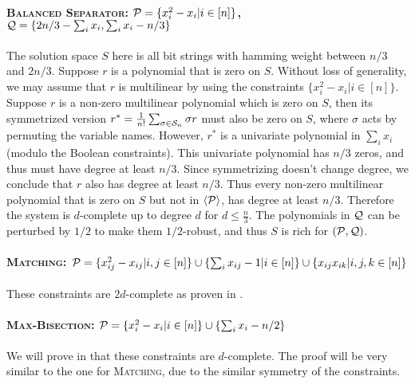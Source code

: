 \paragraph{\textsc{Balanced Separator}: $\mathcal P = \{x_i^2 - x_i | i \in [n]\}$, $\mathcal Q = \{2n/3 - \sum_i x_i, \sum_i x_i - n/3\}$}
%
The solution space $S$ here is all bit strings with hamming weight between $n/3$ and $2n/3$. 
%
Suppose $r$ is a polynomial that is zero on $S$.  
%
Without loss of generality, we may assume that $r$ is multilinear by using the constraints $\{x_i^2 - x_i | i \in [n]\}$.
%
Suppose $r$ is a non-zero multilinear polynomial which is zero on $S$, then its symmetrized version $r^* = \frac{1}{n!}\sum_{\sigma \in \mathcal S_n} \sigma r$ must also be zero on $S$, where $\sigma$ acts by permuting the variable names. However, $r^*$ is a univariate polynomial in $\sum_i x_i$ (modulo the Boolean constraints). 
%
This univariate polynomial has $n/3$ zeros, and thus must have degree at least $n/3$. Since symmetrizing doesn't change degree, we conclude that $r$ also has degree at least $n/3$. Thus every non-zero multilinear polynomial that is zero on $S$ but not in $\langle \mathcal P\rangle$, has degree at least $n/3$. 
%
Therefore the system is $d$-complete up to degree $d$ for $d \leq \frac{n}{3}$.
%
The polynomials in $\mathcal Q$ can be perturbed by $1/2$ to make them $1/2$-robust, and thus $S$ is rich for $(\mathcal P, \mathcal Q)$. 

\paragraph{\textsc{Matching}: $\mathcal P = \{x_{ij}^2 - x_{ij} | i,j \in [n]\} \cup \{\sum_i x_{ij} - 1 | i \in [n]\} \cup \{x_{ij}x_{ik} | i,j,k \in [n]\}$} These constraints are $2d$-complete as proven in \cite{Braun:2016:MPN:2884435.2884510}.

\paragraph{\textsc{Max-Bisection}: $\mathcal P = \{x_i^2 - x_i | i \in [n]\} \cup \{\sum_i x_i - n/2\}$} We will prove in  that these constraints are $d$-complete. The proof will be very similar to the one for \textsc{Matching}, due to the similar symmetry of the constraints.


